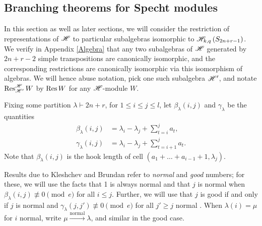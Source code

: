 \documentclass{amsart}
\begin{document}
  \subsection{Branching theorems for Specht modules}
  In this section as well as later sections, we will consider the restriction of representations of $\mathscr{H}$ to particular subalgebras isomorphic to $\mathscr{H}_{k,q}\left( S_{2n + r - 1} \right)$.
  We verify in Appendix \ref{Algebra} that any two subalgebras of $\mathscr{H}$ generated by $2n + r - 2$ simple transpositions are canonically isomorphic, and the corresponding restrictions are canonically isomorphic via this isomorphism of algebras.
  We will hence abuse notation, pick one such subalgebra $\mathscr{H}'$, and notate $\operatorname{Res}_{\mathscr{H}'}^{\mathscr{H}} W$ by $\operatorname{Res} W$ for any $\mathscr{H}$-module $W$.
  

  
  Fixing some partition $\lambda \vdash 2n + r$, for $1 \leq i \leq j \leq l$, let $\beta_\lambda(i,j)$ and $\gamma_\lambda$ be the quantities
  \begin{align*}
    \beta_\lambda(i,j) &= \lambda_i - \lambda_j + \sum_{t = i}^j a_t,\\
    \gamma_\lambda(i,j) &= \lambda_i - \lambda_j + \sum_{t = i+1}^j a_t.
  \end{align*}
  Note that $\beta_\lambda(i,j)$ is the hook length of cell $(a_1 + \dots + a_{i-1}+1,\lambda_j)$.

  Results due to Kleshchev and Brundan refer to \emph{normal} and \emph{good} numbers;
  for these, we will use the facts that 1 is always normal and that $j$ is normal when $\beta_\lambda(i,j) \not\equiv 0 \pmod e$ for all $i \leq j$.
  Further, we will use that $j$ is good if and only if $j$ is normal and $\gamma_\lambda(j,j') \not\equiv 0 \pmod e$ for all $j' \geq j$ normal \cite{Brundan,Kleshchev}.
  When $\lambda(i) = \mu$ for $i$ normal, write $\mu \xrightarrow{\text{normal}} \lambda$, and similar in the good case.
\end{document}
